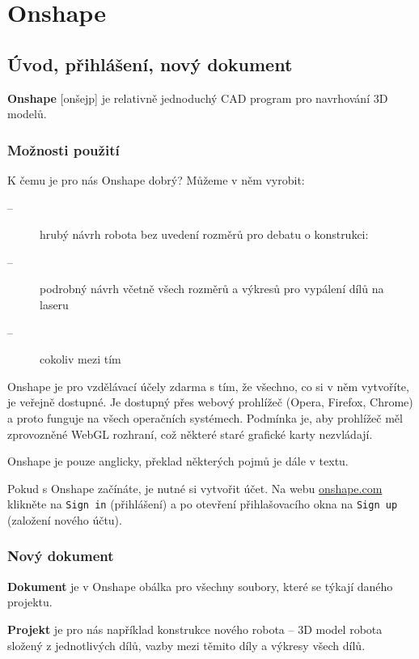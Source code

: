 
\section{Onshape}

\subsection{Úvod, přihlášení, nový dokument}

\textbf{Onshape} 
 [onšejp] je relativně jednoduchý CAD program pro navrhování 3D modelů. 
 
 \subsubsection{Možnosti použití}
 
 K čemu je pro nás Onshape dobrý? Můžeme v něm vyrobit: 
 
 \begin{description}
 	\item[--] hrubý návrh robota bez uvedení rozměrů pro debatu o konstrukci: 
 	\item[--] podrobný návrh včetně všech rozměrů a výkresů pro vypálení dílů na laseru  
 	\item[--] cokoliv mezi tím
 \end{description}
 
 
Onshape je pro vzdělávací účely zdarma s tím, že všechno, co si v něm vytvoříte, je veřejně dostupné. 
Je dostupný přes webový prohlížeč (Opera, Firefox, Chrome) a proto funguje na všech operačních systémech. 
Podmínka je, aby prohlížeč měl zprovozněné WebGL rozhraní, což některé staré grafické karty nezvládají. 

Onshape je pouze anglicky, překlad některých pojmů je dále v textu.

Pokud s Onshape začínáte, je nutné si vytvořit účet. 
Na webu \url{onshape.com} klikněte na {\tt Sign in} (přihlášení) a po otevření přihlašovacího okna na {\tt Sign up} (založení nového účtu).


\subsubsection{Nový dokument}


\textbf{Dokument} je v Onshape obálka pro všechny soubory, které se týkají daného projektu. 

 \textbf{Projekt} je pro nás například konstrukce nového robota -- 3D model robota složený z jednotlivých dílů, vazby mezi těmito díly a výkresy všech dílů. 
 
